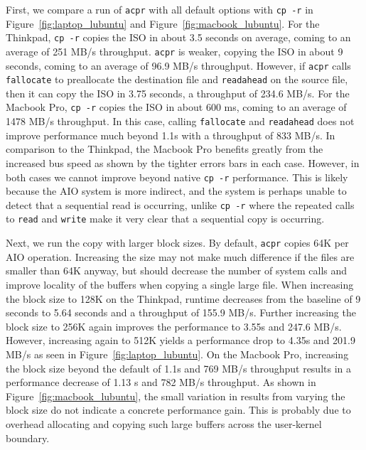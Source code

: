 \documentclass[11pt]{article}
\begin{document}
First, we compare a run of \texttt{acpr} with all default options with
\texttt{cp -r} in Figure~\ref{fig:laptop_lubuntu} and
Figure~\ref{fig:macbook_lubuntu}. For the Thinkpad, \texttt{cp -r} copies the
ISO in about 3.5 seconds on average, coming to an average of 251 MB/s
throughput. \texttt{acpr} is weaker, copying the ISO in about 9 seconds, coming
to an average of 96.9 MB/s throughput.  However, if \texttt{acpr} calls
\texttt{fallocate} to preallocate the destination file and \texttt{readahead} on
the source file, then it can copy the ISO in 3.75 seconds, a throughput of 234.6
MB/s. For the Macbook Pro, \texttt{cp -r} copies the ISO in about 600 ms, coming
to an average of 1478 MB/s throughput. In this case, calling \texttt{fallocate}
and \texttt{readahead} does not improve performance much beyond 1.1s with a
throughput of 833 MB/s. In comparison to the Thinkpad, the Macbook Pro benefits
greatly from the increased bus speed as shown by the tighter errors bars in each
case. However, in both cases we cannot improve beyond native \texttt{cp -r}
performance. This is likely because the AIO system is more indirect, and the
system is perhaps unable to detect that a sequential read is occurring, unlike
\texttt{cp -r} where the repeated calls to \texttt{read} and \texttt{write} make
it very clear that a sequential copy is occurring.

Next, we run the copy with larger block sizes. By default, \texttt{acpr} copies
64K per AIO operation. Increasing the size may not make much difference if the
files are smaller than 64K anyway, but should decrease the number of system
calls and improve locality of the buffers when copying a single large file. When
increasing the block size to 128K on the Thinkpad, runtime decreases from the
baseline of 9 seconds to 5.64 seconds and a throughput of 155.9 MB/s. Further
increasing the block size to 256K again improves the performance to 3.55s and
247.6 MB/s. However, increasing again to 512K yields a performance drop to 4.35s
and 201.9 MB/s as seen in Figure~\ref{fig:laptop_lubuntu}. On the Macbook Pro,
increasing the block size beyond the default of 1.1s and 769 MB/s throughput
results in a performance decrease of 1.13 s and 782 MB/s throughput. As shown in
Figure~\ref{fig:macbook_lubuntu}, the small variation in results from varying
the block size do not indicate a concrete performance gain. This is probably due
to overhead allocating and copying such large buffers across the user-kernel
boundary.
\end{document}
